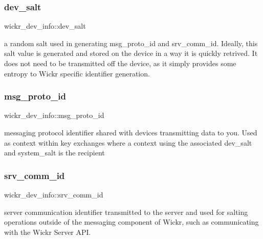 \subsubsection{\texorpdfstring{dev\+\_\+salt}{dev\_salt}}
{\footnotesize\ttfamily wickr\+\_\+dev\+\_\+info\+::dev\+\_\+salt}

a random salt used in generating \textquotesingle{}msg\+\_\+proto\+\_\+id\textquotesingle{} and \textquotesingle{}srv\+\_\+comm\+\_\+id\textquotesingle{}. Ideally, this salt value is generated and stored on the device in a way it is quickly retrived. It does not need to be transmitted off the device, as it simply provides some entropy to Wickr specific identifier generation. \mbox{\label{structwickr__dev__info_a864ad03c4d10f51fe6251059007276d2}} 
\subsubsection{\texorpdfstring{msg\+\_\+proto\+\_\+id}{msg\_proto\_id}}
{\footnotesize\ttfamily wickr\+\_\+dev\+\_\+info\+::msg\+\_\+proto\+\_\+id}

messaging protocol identifier shared with devices transmitting data to you. Used as context within key exchanges where a context using the associated \textquotesingle{}dev\+\_\+salt\textquotesingle{} and \textquotesingle{}system\+\_\+salt\textquotesingle{} is the recipient \mbox{\label{structwickr__dev__info_af5f2ff06ae74fcec85106f6ffd77c008}} 
\subsubsection{\texorpdfstring{srv\+\_\+comm\+\_\+id}{srv\_comm\_id}}
{\footnotesize\ttfamily wickr\+\_\+dev\+\_\+info\+::srv\+\_\+comm\+\_\+id}

server communication identifier transmitted to the server and used for salting operations outside of the messaging component of Wickr, such as communicating with the Wickr Server A\+PI. \mbox{\label{structwickr__dev__info_a084d0cd9e73d9f74f62c9e9abb85436f}} 
